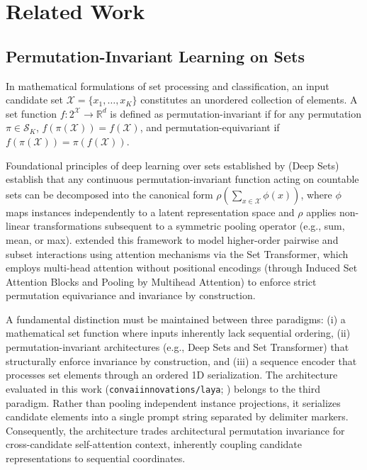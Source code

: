 \documentclass[10pt]{article}
\begin{document}
\section{Related Work}

\subsection{Permutation-Invariant Learning on Sets}
In mathematical formulations of set processing and classification, an input candidate set $\mathcal{X} = \{x_1, \dots, x_K\}$ constitutes an unordered collection of elements. A set function $f: 2^{\mathcal{X}} \to \mathbb{R}^d$ is defined as permutation-invariant if for any permutation $\pi \in \mathcal{S}_K$, $f(\pi(\mathcal{X})) = f(\mathcal{X})$, and permutation-equivariant if $f(\pi(\mathcal{X})) = \pi(f(\mathcal{X}))$.

Foundational principles of deep learning over sets established by \citet{zaheer2017deep} (Deep Sets) establish that any continuous permutation-invariant function acting on countable sets can be decomposed into the canonical form $\rho\left( \sum_{x \in \mathcal{X}} \phi(x) \right)$, where $\phi$ maps instances independently to a latent representation space and $\rho$ applies non-linear transformations subsequent to a symmetric pooling operator (e.g., sum, mean, or max). \citet{lee2019set} extended this framework to model higher-order pairwise and subset interactions using attention mechanisms via the Set Transformer, which employs multi-head attention without positional encodings (through Induced Set Attention Blocks and Pooling by Multihead Attention) to enforce strict permutation equivariance and invariance by construction.

A fundamental distinction must be maintained between three paradigms: (i) a mathematical set function where inputs inherently lack sequential ordering, (ii) permutation-invariant architectures (e.g., Deep Sets and Set Transformer) that structurally enforce invariance by construction, and (iii) a sequence encoder that processes set elements through an ordered 1D serialization. The architecture evaluated in this work (\nolinkurl{convaiinnovations/laya}; \citealp{laya2024}) belongs to the third paradigm. Rather than pooling independent instance projections, it serializes candidate elements into a single prompt string separated by delimiter markers. Consequently, the architecture trades architectural permutation invariance for cross-candidate self-attention context, inherently coupling candidate representations to sequential coordinates.
\end{document}

